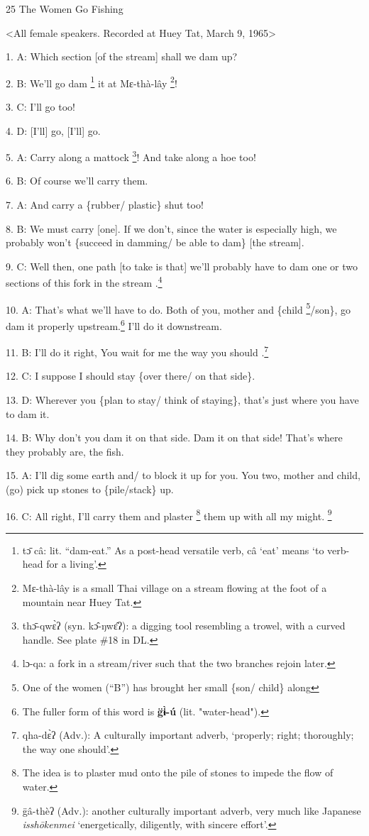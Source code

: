 
25 The Women Go Fishing

<All female speakers. Recorded at Huey Tat, March 9, 1965>

1. A: Which section [of the stream] shall we dam up?

2. B: We'll go dam \footnote{tɔ̄ câ: lit. ``dam-eat.'' As a post-head versatile verb, câ `eat' means `to verb-head for a living'.} it at Mɛ-thà-lây \footnote{Mɛ-thà-lây is a small Thai village on a stream flowing at the foot of a mountain near Huey Tat.}!

3. C: I'll go too!

4. D: [I'll] go, [I'll] go.

5. A: Carry along a mattock \footnote{thɔ̄-qwɛ̀ʔ (syn. kɔ̂-ŋwɛ̂ʔ): a digging tool resembling a trowel, with a curved handle. See plate \#18 in DL.}! And take along a hoe too!

6. B: Of course we'll carry them.

7. A: And carry a \{rubber/ plastic\} shut too!

8. B: We must carry [one]. If we don't, since the water is especially high, we
probably won't \{succeed in damming/ be able to dam\} [the stream].

9. C: Well then, one path [to take is that] we'll probably have to dam one or two
sections of this fork in the stream .\footnote{lɔ-qa: a fork in a stream/river such that the two branches rejoin later.}

10. A: That's what we'll have to do. Both of you, mother and \{child \footnote{One of the women (``B'') has brought her small \{son/ child\} along}/son\},
go dam it properly upstream.\footnote{The fuller form of this word is \textbf{g̈ɨ̀-ú} (lit. "water-head").} I'll do it downstream.

11. B: I'll do it right, You wait for me the way you should .\footnote{qha-dɛ̀ʔ (Adv.): A culturally important adverb, `properly; right; thoroughly; the way one should'.}

12. C: I suppose I should stay \{over there/ on that side\}.

13. D: Wherever you \{plan to stay/ think of staying\}, that's just where you have
to dam it.

14. B: Why don't you dam it on that side. Dam it on that side! That's where they
probably are, the fish.

15. A: I'll dig some earth and/ to block it up for you.  You two, mother and child,
(go) pick up stones to \{pile/stack\} up.

16. C: All right, I'll carry them and plaster \footnote{The idea is to plaster mud onto the pile of stones to impede the flow of water.} them up with all my might. \footnote{g̈â-thèʔ (Adv.): another culturally important adverb, very much like Japanese \textit{isshōkenmei} `energetically, diligently, with sincere effort'.}


